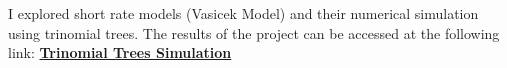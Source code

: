 \documentclass[]{deedy-resume-openfont}
\begin{document}
\begin{minipage}[t]{0.64\textwidth}
I explored short rate models (Vasicek Model) and their numerical simulation using trinomial trees. The results of the project can be accessed at the following link: \href{http://simulations.lpsm.paris/trinomial_trees/}{\bf Trinomial Trees Simulation}
\sectionsep

\end{minipage} 
\end{document}
